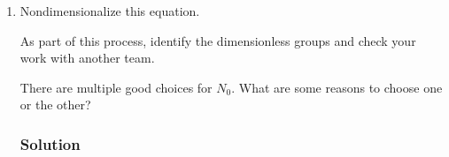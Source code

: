 \documentclass[12pt]{amsart}
\theoremstyle{conjecture}
\theoremstyle{definition}
\theoremstyle{question}
\theoremstyle{theorem}
\begin{document}
\begin{enumerate}[label=(\alph*)]
        \subsubsection*{Solution}

        Again let \(P\) denote population and \(T\) denote time.

        We have
        \[
            [N]=P,
            \qquad
            [t]=T.
        \]

        As before,
        \[
            [r]=T^{-1},
            \qquad
            [K]=P.
        \]

        Because \(A\) is added to \(N\),
        \[
            [A]=[N]=P.
        \]

        Now consider
        \[
            \frac{HN}{A+N}.
        \]

        Since
        \[
            \left[
                \frac{N}{A+N}
            \right]
            =1,
        \]
        the parameter \(H\) itself must have the dimension of population per
        unit time:
        \[
            [H]=\frac{P}{T}.
        \]

        Therefore,
        \[
            \boxed{
                [N]=P,\qquad
                [t]=T,\qquad
                [r]=T^{-1},\qquad
                [K]=P,\qquad
                [A]=P,\qquad
                [H]=PT^{-1}.
            }
        \]

        There are four dimensional parameters:
        \[
            r,\qquad K,\qquad A,\qquad H.
        \]

        There are two fundamental dimensions involved:
        \[
            P
            \qquad\text{and}\qquad
            T.
        \]

        We therefore expect nondimensionalization to reduce the number of
        independent parameters by two. Hence we expect
        \[
            \boxed{4-2=2}
        \]
        independent nondimensional parameters to remain.

        \item
        Nondimensionalize this equation.

        As part of this process, identify the dimensionless groups and check
        your work with another team.

        There are multiple good choices for \(N_0\). What are some reasons to
        choose one or the other?

        \subsubsection*{Solution}


\end{enumerate}
\end{document}
